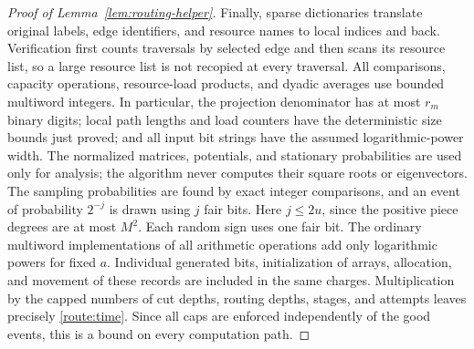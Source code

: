\begin{proof}[Proof of Lemma~\ref{lem:routing-helper}]
Finally, sparse dictionaries translate original labels, edge
identifiers, and resource names to local indices and back.
Verification first counts traversals by selected edge and then
scans its resource list, so a large resource list is not recopied
at every traversal.  All comparisons, capacity operations,
resource-load products, and dyadic averages use bounded
multiword integers.  In particular, the projection denominator
has at most $r_m$ binary digits; local path lengths and load
counters have the deterministic size bounds just proved; and
all input bit strings have the assumed logarithmic-power width.
The normalized matrices, potentials, and stationary probabilities
are used only for analysis; the algorithm never computes their
square roots or eigenvectors.  The sampling probabilities are
found by exact integer comparisons, and an event of probability
$2^{-j}$ is drawn using $j$ fair bits.  Here $j\le2u$, since the
positive piece degrees are at most $M^2$.  Each random sign uses
one fair bit.  The ordinary multiword implementations of all
arithmetic operations add only logarithmic powers for fixed $a$.
Individual generated bits,
initialization of arrays, allocation, and movement of these
records are included in the same charges.  Multiplication by the
capped numbers of cut depths, routing depths, stages, and
attempts leaves precisely \eqref{route:time}.  Since all caps
are enforced independently of the good events, this is a bound
on every computation path.
\end{proof}
